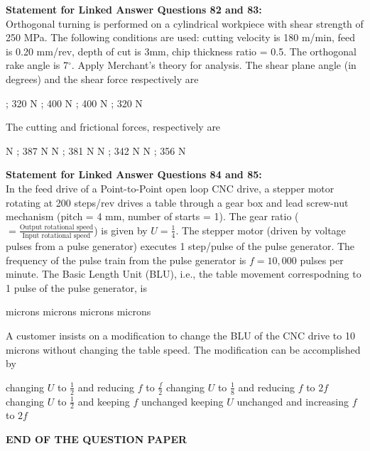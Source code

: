 \documentclass[addpoints,11pt]{exam}
\begin{document}
\begin{questions}
\normalsize\textbf{Statement for Linked Answer Questions 82 and 83:}\\
Orthogonal turning is performed on a cylindrical workpiece with shear strength of 250 MPa. The following conditions are used: cutting velocity is 180 m/min, feed is 0.20 mm/rev, depth of cut is 3mm, chip thickness ratio = 0.5. The orthogonal rake angle is 7$^\circ$. Apply Merchant's theory for analysis.
    \question The shear plane angle (in degrees) and the shear force respectively are

    \begin{oneparchoices}
         ; 320 N
         ; 400 N
         ; 400 N
         ; 320 N
    \end{oneparchoices}

    \question The cutting and frictional forces, respectively are

    \begin{oneparchoices}
         N ; 387 N
         N ; 381 N
         N ; 342 N
         N ; 356 N
    \end{oneparchoices}

\normalsize\textbf{Statement for Linked Answer Questions 84 and 85:}\\
In the feed drive of a Point-to-Point open loop CNC drive, a stepper motor rotating at 200 steps/rev drives a table through a gear box and lead screw-nut mechanism (pitch = 4 mm, number of starts = 1). The gear ratio ($=\frac{\text{Output rotational speed}}{\text{Input rotational speed}}$) is given by $U=\frac{1}{4}$. The stepper motor (driven by voltage pulses from a pulse generator) executes 1 step/pulse of the pulse generator. The frequency of the pulse train from the pulse generator is $f=10,000$ pulses per minute.%
    \question The Basic Length Unit (BLU), i.e., the table movement correspodning to 1 pulse of the pulse generator, is

    \begin{oneparchoices}
         microns
         microns
         microns
         microns
    \end{oneparchoices}

    \question A customer insists on a modification to change the BLU of the CNC drive to 10 microns without changing the table speed. The modification can be accomplished by

    \begin{choices}
        \choice changing $U$ to $\frac{1}{2}$ and reducing $f$ to $\frac{f}{2}$
        \choice changing $U$ to $\frac{1}{8}$ and reducing $f$ to $2f$
        \choice changing $U$ to $\frac{1}{2}$ and keeping $f$ unchanged
        \choice keeping $U$ unchanged and increasing $f$ to $2f$
    \end{choices}

\vspace{1cm}
\centering\Large\textbf{END OF THE QUESTION PAPER}
\end{questions}
\end{document}
